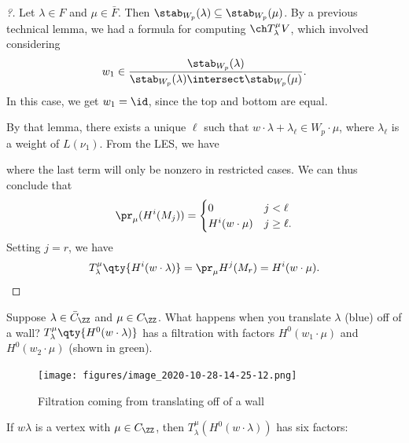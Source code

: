 \begin{proof}[?]

Let \(\lambda \in F\) and \(\mu\in\bar{F}\). Then
\(\stab_{W_p}(\lambda) \subseteq \stab_{W_p}(\mu)\). By a previous
technical lemma, we had a formula for computing \(\ch T_\lambda^\mu V\),
which involved considering
\begin{align*}  
w_1 \in {\stab_{W_p}(\lambda) \over \stab_{W_p}(\lambda) \intersect \stab_{W_p}(\mu)}
.\end{align*} In this case, we get \(w_1 = \id\), since the top and
bottom are equal.

By that lemma, there exists a unique \(\ell\) such that
\(w\cdot \lambda + \lambda_\ell \in W_p\cdot \mu\), where
\(\lambda_\ell\) is a weight of \(L(\nu_1)\). From the LES, we have

\begin{center}\end{center}

where the last term will only be nonzero in restricted cases. We can
thus conclude that
\begin{align*}  
\pr_\mu(H^i(M_j))  =
\begin{cases}
0 & j< \ell \\
H^i(w\cdot \mu) & j\geq \ell.
\end{cases}
\end{align*} Setting \(j=r\), we have
\begin{align*}  
T_\lambda^\mu \qty{H^i(w\cdot\lambda)} = \pr_\mu H^j(M_r) = H^i(w\cdot \mu)
.\end{align*}

\end{proof}

Suppose \(\lambda \in \bar{C}_\ZZ\) and \(\mu \in C_\ZZ\). What happens
when you translate \(\lambda\) (blue) off of a wall?
\(T_\lambda^\mu\qty{H^0(w\cdot \lambda)}\) has a filtration with factors
\(H^0(w_1\cdot \mu)\) and \(H^0(w_2\cdot \mu)\) (shown in green).

\begin{figure}
\centering
\texttt{[image: figures/image\_2020-10-28-14-25-12.png]}
\caption{Filtration coming from translating off of a wall}
\end{figure}

If \(w\lambda\) is a vertex with \(\mu \in C_\ZZ\), then
\(T_\lambda^\mu(H^0(w\cdot \lambda))\) has six factors:

